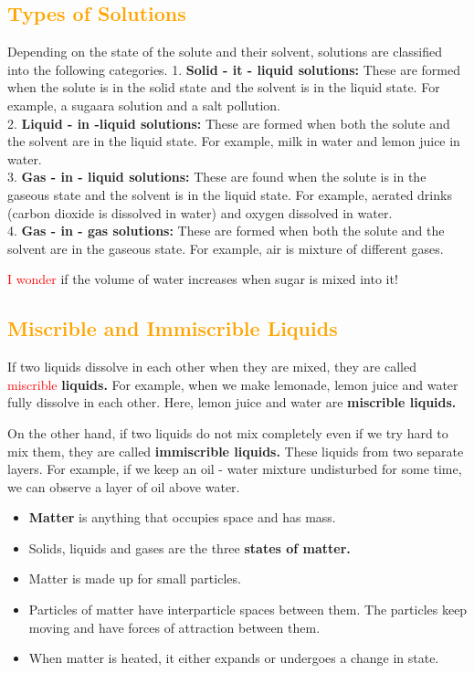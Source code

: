 \subsection{\textcolor{orange}{Types of Solutions}}
Depending on the state of the solute and their solvent, solutions are classified into the following categories.
1. \textbf{Solid - it - liquid solutions:} These are formed when the solute is in the solid state and the solvent is in the liquid state. For example, a sugaara solution and a salt pollution.\\
2. \textbf{Liquid - in -liquid solutions:} These are formed when both the solute and the solvent are in the liquid state. For example, milk in water and lemon juice in water.\\
3. \textbf{Gas - in - liquid solutions:} These are found when the solute is in the gaseous state and the solvent is in the liquid state. For example, aerated drinks (carbon dioxide is dissolved in water) and oxygen dissolved in water.\\
4. \textbf{Gas - in - gas solutions:} These are formed when both the solute and the solvent are in the gaseous state. For example, air is mixture of different gases.\\
\par
\textcolor{red}{I wonder} if the volume of water increases when sugar is mixed into it!
\subsection{\textcolor{orange}{Miscrible and Immiscrible Liquids}}
If two liquids dissolve in each other when they are mixed, they are called \textcolor{red}{miscrible} \textbf{liquids.}
For example, when we make lemonade, lemon juice and water fully dissolve in each other. Here, lemon juice and water are \textbf{miscrible liquids.}\\
\par
On the other hand, if two liquids do not mix completely even if we try hard to mix them, they are called \textbf{immiscrible liquids.} These liquids from two separate layers. For example, if we keep an oil - water mixture undisturbed for some time, we can observe a layer of oil above water.
\begin{itemize}
    \item \textbf{Matter} is anything that occupies space and has mass.
    \item Solids, liquids and gases are the three \textbf{states of matter.}
    \item Matter is made up for small particles.
    \item Particles of matter have interparticle spaces between them. The particles keep moving and have forces of attraction between them.
    \item When matter is heated, it either expands or undergoes a change in state.\\
\end{itemize}